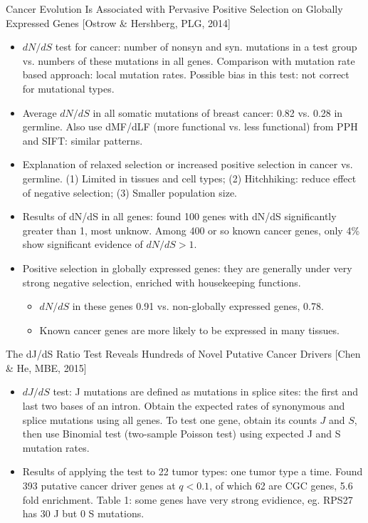 \documentclass{report}
\begin{document}
Cancer Evolution Is Associated with Pervasive Positive Selection on Globally Expressed Genes [Ostrow \& Hershberg, PLG, 2014]
\begin{itemize}
	\item $dN/dS$ test for cancer: number of nonsyn and syn. mutations in a test group vs. numbers of these mutations in all genes. Comparison with mutation rate based approach: local mutation rates. Possible bias in this test: not correct for mutational types. 
	
	\item Average $dN/dS$ in all somatic mutations of breast cancer: 0.82 vs. 0.28 in germline. Also use dMF/dLF (more functional vs. less functional) from PPH and SIFT: similar patterns. 
	
	\item Explanation of relaxed selection or increased positive selection in cancer vs. germline. (1) Limited in tissues and cell types; (2) Hitchhiking: reduce effect of negative selection; (3) Smaller population size. 
	
	\item Results of dN/dS in all genes: found 100 genes with dN/dS significantly greater than 1, most unknow. Among 400 or so known cancer genes, only 4\% show significant evidence of $dN/dS > 1$. 
	
	\item Positive selection in globally expressed genes: they are generally under very strong negative selection, enriched with housekeeping functions. 
	\begin{itemize}
		\item $dN/dS$ in these genes 0.91 vs. non-globally expressed genes, 0.78. 
		\item Known cancer genes are more likely to be expressed in many tissues. 
	\end{itemize}
\end{itemize}

The dJ/dS Ratio Test Reveals Hundreds of Novel Putative Cancer Drivers [Chen \& He, MBE, 2015]
\begin{itemize}
	\item $dJ/dS$ test: J mutations are defined as mutations in splice sites: the first and last two bases of an intron. Obtain the expected rates of synonymous and splice mutations using all genes. To test one gene, obtain its counts $J$ and $S$, then use Binomial test (two-sample Poisson test) using expected J and S mutation rates. 
	
	\item Results of applying the test to 22 tumor types: one tumor type a time. Found 393 putative cancer driver genes at $q < 0.1$, of which 62 are CGC genes, 5.6 fold enrichment. Table 1: some genes have very strong evidience, eg. RPS27 has 30 J but 0 S mutations. 
	
\end{itemize}
\end{document}
